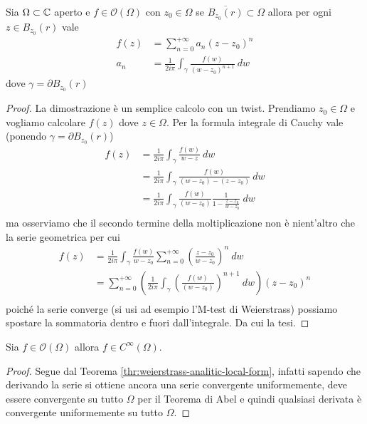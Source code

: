 \begin{theorem}
    Sia $\Omega \subset \mathbb{C}$ aperto e $f \in \mathcal{O}(\Omega)$ con $z_0 \in
    \Omega$ se $\overline{B_{z_0}(r)} \subset \Omega$ allora per ogni $z \in
    B_{z_0}(r)$ vale
    \begin{equation*}
      \begin{aligned}
         f(z) & = \sum^{+\infty}_{n=0} a_n(z-z_0)^n \\ 
         a_n  & =\frac{1}{2i\pi} \int_\gamma \frac{f(w)}{(w-z_0)^{n+1}}\ dw
      \end{aligned}
    \end{equation*}
    dove $\gamma = \partial B_{z_0}(r)$
    \label{thr:weierstrass-analitic-local-form}
\end{theorem}
\begin{proof}
    La dimostrazione è un semplice calcolo con un twist. 
    Prendiamo $z_0 \in \Omega$ e vogliamo calcolare $f(z)$ dove $z\in
    \Omega$. Per la formula integrale di Cauchy vale (ponendo $\gamma
    = \partial B_{z_0}(r)$) 
    \begin{align*}
      f(z) & = \frac{1}{2i\pi} \int_\gamma \frac{f(w)}{w-z}\ dw \\
           & = \frac{1}{2i\pi} \int_\gamma \frac{f(w)}{(w-z_0) - (z-z_0)}\
           dw \\
           & = \frac{1}{2i\pi} \int_\gamma \frac{f(w)}{(w-z_0)}
           \frac{1}{1 - \frac{z - z_0}{w-z_0}} \ dw \\
    \end{align*}
    ma osserviamo che il secondo termine della moltiplicazione non
    è nient'altro che la serie geometrica per cui 
    \begin{align*}
      f(z) 	& = \frac{1}{2i\pi} \int_\gamma \frac{f(w)}{w-z_0}\sum^{+\infty}_{n=0} \left(\frac{z-z_0}{w-z_0}\right)^n \ dw \\
     	 	 	&  = \sum^{+\infty}_{n=0} \left(\frac{1}{2i\pi} \int_\gamma \left(\frac{f(w)}{(w-z_0)}\right)^{n+1} \ dw\right) (z-z_0)^n  \\
    \end{align*}
    poiché la serie converge (si usi ad esempio l'M-test di Weierstrass)
    possiamo spostare la sommatoria dentro e fuori dall'integrale. Da cui
    la tesi.
\end{proof}

\begin{corollary}
  Sia $f \in \mathcal{O}(\Omega)$ allora $f \in C^{\infty}(\Omega)$.
  \label{cor:olomorphism-c-infty}
\end{corollary}
\begin{proof}
  Segue dal Teorema \ref{thr:weierstrass-analitic-local-form}, infatti
  sapendo che derivando la serie si ottiene ancora una serie convergente
  uniformemente, deve essere convergente su tutto $\Omega$ per il Teorema di
  Abel e quindi qualsiasi derivata è convergente uniformemente su tutto
  $\Omega$. 
\end{proof}

